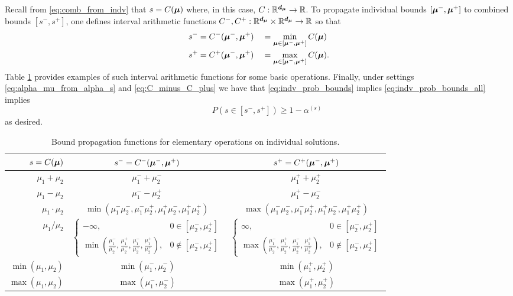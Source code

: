 \documentclass{article}[12pt]
\begin{document}
Recall from \eqref{eq:comb_from_indv} that $s = C(\boldsymbol{\mu})$ where, in this case, $C: \mathbb{R}^{\boldsymbol{d}_{\boldsymbol{\mu}}} \to \mathbb{R}$. To propagate individual bounds $[\boldsymbol{\mu}^-,\boldsymbol{\mu}^+]$ to combined bounds $[s^-,s^+]$, one defines interval arithmetic \cite{interval_analysis} functions $C^-,C^+: \mathbb{R}^{\boldsymbol{d}_{\boldsymbol{\mu}}} \times \mathbb{R}^{\boldsymbol{d}_{\boldsymbol{\mu}}} \to \mathbb{R}$ so that
\begin{equation}
    \begin{aligned}
    s^- &= C^-(\boldsymbol{\mu}^-,\boldsymbol{\mu}^+) &&= \min_{\boldsymbol{\mu} \in [\boldsymbol{\mu}^-,\boldsymbol{\mu}^+]} C(\boldsymbol{\mu}) \\
    s^+ &= C^+(\boldsymbol{\mu}^-,\boldsymbol{\mu}^+) &&= \max_{\boldsymbol{\mu} \in [\boldsymbol{\mu}^-,\boldsymbol{\mu}^+]} C(\boldsymbol{\mu}).
    \end{aligned}
    \label{eq:C_minus_C_plus}
\end{equation}
Table \ref{table:elementary_ops_Cpm} provides examples of such interval arithmetic functions for some basic operations. Finally, under settings \eqref{eq:alpha_mu_from_alpha_s} and \eqref{eq:C_minus_C_plus} we have that  \eqref{eq:indv_prob_bounds} implies \eqref{eq:indv_prob_bounds_all} implies
$$\qquad  P(s \in [s^-,s^+]) \geq 1-\alpha^{(s)}$$
as desired.

\begin{table}[H]
\begin{tabular}{r  c  c}
    $s=C(\boldsymbol{\mu})$ & $s^- = C^-(\boldsymbol{\mu}^-,\boldsymbol{\mu}^+)$ & $s^+ = C^+(\boldsymbol{\mu}^-,\boldsymbol{\mu}^+)$ \\
    \hline
    $\mu_1+\mu_2$ & $\mu_1^-+\mu_2^-$ & $\mu_1^++\mu_2^+$ \\
    $\mu_1-\mu_2$ & $\mu_1^--\mu_2^+$ & $\mu_1^+-\mu_2^-$ \\
    $\mu_1 \cdot \mu_2$ & $\min(\mu_1^-\mu_2^-,\mu_1^-\mu_2^+,\mu_1^+\mu_2^-,\mu_1^+\mu_2^+)$ & $\max(\mu_1^-\mu_2^-,\mu_1^-\mu_2^+,\mu_1^+\mu_2^-,\mu_1^+\mu_2^+)$ \\
    $\mu_1 / \mu_2$ & $\begin{cases} -\infty, & 0 \in [\mu_2^-,\mu_2^+] \\ \min\left(\frac{\mu_1^-}{\mu_2^-},\frac{\mu_1^+}{\mu_2^-},\frac{\mu_1^-}{\mu_2^+},\frac{\mu_1^+}{\mu_2^+}\right), & 0 \notin [\mu_2^-,\mu_2^+] \end{cases}$ & $\begin{cases} \infty, & 0 \in [\mu_2^-,\mu_2^+] \\ \max\left(\frac{\mu_1^-}{\mu_2^-},\frac{\mu_1^+}{\mu_2^-},\frac{\mu_1^-}{\mu_2^+},\frac{\mu_1^+}{\mu_2^+}\right), & 0 \notin [\mu_2^-,\mu_2^+] \end{cases}$ \\
    $\min(\mu_1,\mu_2)$ & $\min(\mu_1^-,\mu_2^-)$ & $\min(\mu_1^+,\mu_2^+)$ \\
    $\max(\mu_1,\mu_2)$ & $\max(\mu_1^-,\mu_2^-)$ & $\max(\mu_1^+,\mu_2^+)$ \\
    \hline
\end{tabular}
\caption{Bound propagation functions for elementary operations on individual solutions.}
\label{table:elementary_ops_Cpm}
\end{table}
\end{document}
